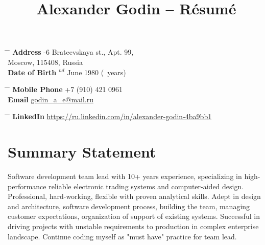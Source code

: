 \documentclass[10pt]{article} %
\begin{document}

\title{Alexander Godin -- Résumé} %


\parbox{0.5\textwidth}{
\begin{tabbing} %
\hspace{3cm} \= \hspace{4cm} \= \kill %
{\bf Address} -6 Brateevskaya st., Apt. 99, \\ %
\> Moscow, 115408, Russia \\ %
{\bf Date of Birth} $^{nd}$ June 1980 (\myage\ years)\\ %
\end{tabbing}}
\vspace{-10mm}
\hfill
\parbox{0.5\textwidth}{
\begin{tabbing}
\hspace{3cm} \= \hspace{4cm} \= \kill %
{\bf Mobile Phone} \> +7 (910) 421 0961 \\ %
{\bf Email} \> \href{mailto:godin\_a\_e@mail.ru}{godin\_a\_e@mail.ru}
\end{tabbing}}
\parbox{0.5\textwidth}{
\begin{tabbing}
\hspace{3cm} \= \hspace{4cm} \= \kill %
{\bf LinkedIn} \> \href{https://ru.linkedin.com/in/alexander-godin-4ba9bb1}{https://ru.linkedin.com/in/alexander-godin-4ba9bb1}
\end{tabbing}}


\section{Summary Statement}

Software development team lead with 10+ years experience, specializing 
in high-performance reliable electronic trading systems and computer-aided design.
Professional, hard-working, flexible with proven analytical skills. Adept in design
and architecture, software development process, building the team, managing customer
expectations, organization of support of existing systems. Successful in driving projects
with unstable requirements to production in complex enterprise landscape. Continue coding 
myself as "must have" practice for team lead.
\end{document}

